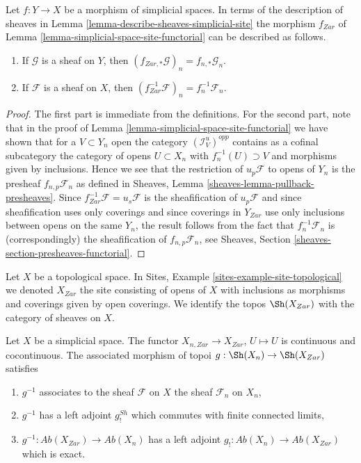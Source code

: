 \begin{lemma}
\label{lemma-describe-functoriality}
Let $f : Y \to X$ be a morphism of simplicial spaces. In terms of the
description of sheaves in
Lemma \ref{lemma-describe-sheaves-simplicial-site} the
morphism $f_{Zar}$ of Lemma \ref{lemma-simplicial-space-site-functorial}
can be described as follows.
\begin{enumerate}
\item If $\mathcal{G}$ is a sheaf on $Y$, then
$(f_{Zar, *}\mathcal{G})_n = f_{n, *}\mathcal{G}_n$.
\item If $\mathcal{F}$ is a sheaf on $X$, then
$(f_{Zar}^{-1}\mathcal{F})_n = f_n^{-1}\mathcal{F}_n$.
\end{enumerate}
\end{lemma}

\begin{proof}
The first part is immediate from the definitions. For the second part, note
that in the proof of
Lemma \ref{lemma-simplicial-space-site-functorial}
we have shown that for a $V \subset Y_n$ open the category
$(\mathcal{I}_V^u)^{opp}$ contains as a cofinal subcategory
the category of opens $U \subset X_n$ with $f_n^{-1}(U) \supset V$
and morphisms given by inclusions. Hence we see that the restriction
of $u_p\mathcal{F}$ to opens of $Y_n$ is the presheaf
$f_{n, p}\mathcal{F}_n$ as defined in
Sheaves, Lemma \ref{sheaves-lemma-pullback-presheaves}.
Since $f_{Zar}^{-1}\mathcal{F} = u_s\mathcal{F}$ is the sheafification
of $u_p\mathcal{F}$ and since sheafification uses only coverings and
since coverings in $Y_{Zar}$ use only inclusions between opens on the
same $Y_n$, the result follows from the fact that $f_n^{-1}\mathcal{F}_n$
is (correspondingly) the sheafification of $f_{n, p}\mathcal{F}_n$, see
Sheaves, Section \ref{sheaves-section-presheaves-functorial}.
\end{proof}

\noindent
Let $X$ be a topological space. In
Sites, Example \ref{sites-example-site-topological}
we denoted $X_{Zar}$ the site consisting of opens of $X$
with inclusions as morphisms and coverings given by open coverings.
We identify the topos $\Sh(X_{Zar})$ with the category
of sheaves on $X$.

\begin{lemma}
\label{lemma-restriction-to-components}
Let $X$ be a simplicial space. The functor
$X_{n, Zar} \to X_{Zar}$, $U \mapsto U$ is continuous
and cocontinuous. The associated morphism of
topoi $g : \Sh(X_n) \to \Sh(X_{Zar})$ satisfies
\begin{enumerate}
\item $g^{-1}$ associates to the sheaf $\mathcal{F}$ on $X$
the sheaf $\mathcal{F}_n$ on $X_n$,
\item $g^{-1}$ has a left adjoint $g^{Sh}_!$ which commutes
with finite connected limits,
\item $g^{-1} : \textit{Ab}(X_{Zar}) \to \textit{Ab}(X_n)$
has a left adjoint $g_! : \textit{Ab}(X_n) \to \textit{Ab}(X_{Zar})$
which is exact.
\end{enumerate}
\end{lemma}


